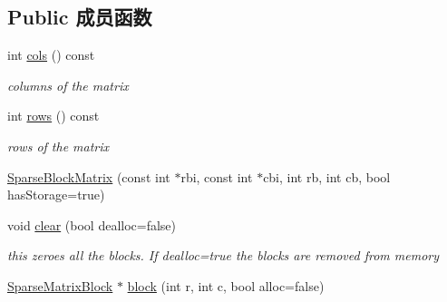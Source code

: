 \subsection*{Public 成员函数}
\begin{DoxyCompactItemize}
\item 
\hypertarget{classg2o_1_1SparseBlockMatrix_ab854ca59f370d93229852e32a7b49d3e}{int \hyperlink{classg2o_1_1SparseBlockMatrix_ab854ca59f370d93229852e32a7b49d3e}{cols} () const }\label{classg2o_1_1SparseBlockMatrix_ab854ca59f370d93229852e32a7b49d3e}

\begin{DoxyCompactList}\small\item\em columns of the matrix \end{DoxyCompactList}\item 
\hypertarget{classg2o_1_1SparseBlockMatrix_adf18fb267e545b9036314cf9f8f10473}{int \hyperlink{classg2o_1_1SparseBlockMatrix_adf18fb267e545b9036314cf9f8f10473}{rows} () const }\label{classg2o_1_1SparseBlockMatrix_adf18fb267e545b9036314cf9f8f10473}

\begin{DoxyCompactList}\small\item\em rows of the matrix \end{DoxyCompactList}\item 
\hyperlink{classg2o_1_1SparseBlockMatrix_a0407f26837522322d7b7fd7a5259ee3c}{Sparse\-Block\-Matrix} (const int $\ast$rbi, const int $\ast$cbi, int rb, int cb, bool has\-Storage=true)
\item 
\hypertarget{classg2o_1_1SparseBlockMatrix_af14b7aaa588b339f2c06793fcc0d4e09}{void \hyperlink{classg2o_1_1SparseBlockMatrix_af14b7aaa588b339f2c06793fcc0d4e09}{clear} (bool dealloc=false)}\label{classg2o_1_1SparseBlockMatrix_af14b7aaa588b339f2c06793fcc0d4e09}

\begin{DoxyCompactList}\small\item\em this zeroes all the blocks. If dealloc=true the blocks are removed from memory \end{DoxyCompactList}\item 
\hypertarget{classg2o_1_1SparseBlockMatrix_aaca7b38d2e9a18eebf9e6f5957af0cf7}{\hyperlink{classg2o_1_1SparseBlockMatrix_ab2f7376cbf055803fda6527dcc43e3be}{Sparse\-Matrix\-Block} $\ast$ \hyperlink{classg2o_1_1SparseBlockMatrix_aaca7b38d2e9a18eebf9e6f5957af0cf7}{block} (int r, int c, bool alloc=false)}\label{classg2o_1_1SparseBlockMatrix_aaca7b38d2e9a18eebf9e6f5957af0cf7}


\end{DoxyCompactItemize}
